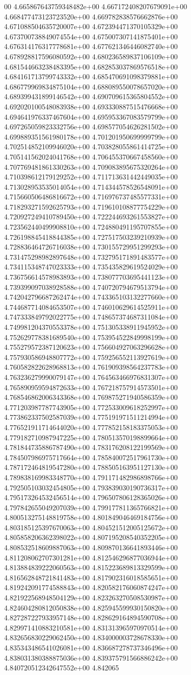 00	4.665867643759348482e+00	4.667172408207679091e+00	4.668477473123723520e+00	4.669782838576662876e+00	4.671088504635720007e+00	4.672394471370105329e+00	4.673700738849074554e+00	4.675007307141875401e+00	4.676314176317778681e+00	4.677621346446082740e+00	4.678928817596080592e+00	4.680236589837106109e+00	4.681544663238483395e+00	4.682853037869576518e+00	4.684161713799743332e+00	4.685470691098379881e+00	4.686779969834875104e+00	4.688089550078657020e+00	4.689399431899146542e+00	4.690709615365804552e+00	4.692020100548083938e+00	4.693330887515476668e+00	4.694641976337467604e+00	4.695953367083579799e+00	4.697265059823332756e+00	4.698577054626281502e+00	4.699889351561980178e+00	4.701201950699999799e+00	4.702514852109946020e+00	4.703828055861414725e+00	4.705141562024041768e+00	4.706455370667458560e+00	4.707769481861330263e+00	4.709083895675320264e+00	4.710398612179129252e+00	4.711713631442449035e+00	4.713028953535014054e+00	4.714344578526548091e+00	4.715660506486816672e+00	4.716976737485577331e+00	4.718293271592625793e+00	4.719610108877754229e+00	4.720927249410789450e+00	4.722244693261553827e+00	4.723562440499908810e+00	4.724880491195707855e+00	4.726198845418844385e+00	4.727517503239210939e+00	4.728836464726716038e+00	4.730155729951299293e+00	4.731475298982897648e+00	4.732795171891483577e+00	4.734115348747023333e+00	4.735435829619524029e+00	4.736756614578983893e+00	4.738077703695441123e+00	4.739399097038928588e+00	4.740720794679513794e+00	4.742042796687262474e+00	4.743365103132277660e+00	4.744687714084653507e+00	4.746010629614525911e+00	4.747333849792022775e+00	4.748657374687311084e+00	4.749981204370553378e+00	4.751305338911945952e+00	4.752629778381689540e+00	4.753954522849998199e+00	4.755279572387120623e+00	4.756604927063296628e+00	4.757930586948807772e+00	4.759256552113927619e+00	4.760582822628968813e+00	4.761909398564237783e+00	4.763236279990079147e+00	4.764563466976831307e+00	4.765890959594872633e+00	4.767218757914573501e+00	4.768546862006343368e+00	4.769875271940586359e+00	4.771203987787743905e+00	4.772533009618252997e+00	4.773862337502587039e+00	4.775191971511214994e+00	4.776521911714644020e+00	4.777852158183375053e+00	4.779182710987947225e+00	4.780513570198899664e+00	4.781844735886787490e+00	4.783176208122199569e+00	4.784507986975717664e+00	4.785840072517961730e+00	4.787172464819547280e+00	4.788505163951127130e+00	4.789838169983348770e+00	4.791171482986898766e+00	4.792505103032454805e+00	4.793839030190736317e+00	4.795173264532456514e+00	4.796507806128365026e+00	4.797842655049207039e+00	4.799177811365766821e+00	4.800513275148819758e+00	4.801849046469184756e+00	4.803185125397670063e+00	4.804521512005125672e+00	4.805858206362398022e+00	4.807195208540352205e+00	4.808532518609887063e+00	4.809870136641893446e+00	4.811208062707301281e+00	4.812546296877036944e+00	4.813884839222060563e+00	4.815223689813329599e+00	4.816562848721841483e+00	4.817902316018585651e+00	4.819242091774588843e+00	4.820582176060874247e+00	4.821922568948504129e+00	4.823263270508530987e+00	4.824604280812050838e+00	4.825945599930150820e+00	4.827287227933957148e+00	4.828629164894590708e+00	4.829971410883210581e+00	4.831313965970970514e+00	4.832656830229062450e+00	4.834000003728678330e+00	4.835343486541026081e+00	4.836687278737346496e+00	4.838031380388875036e+00	4.839375791566886242e+00	4.840720512342647552e+00	4.842065